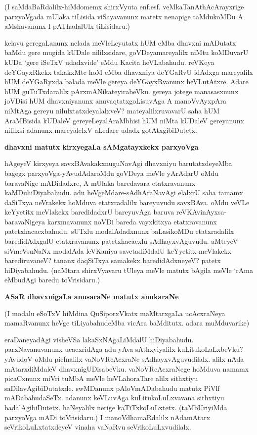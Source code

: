 (I saMdaBaRdalilx-hiMdomemx shirxVyuta enf.esf. veMkaTanAthAcArayxrige 
parxyoVgada mUlaka tiLisida viSayavanunx matetx nenapige taMdukoMDu A aMshavanunx I pAThadalUlx tiLisidaru.)

kelavu geregaLanunx nelada meVleLeyutatx hUM eMba dhavxni mADutatx 
baMdu gere mugida kUDale nililxsidare, goVDeyamareyalilx niMtu 
koMDuvarU kUDa `gere iSeTxV udadxvide' eMdu Kacita heVLabahudu. reVKeya 
deYGayxRkekx takakxMte hoM eMba dhavxniya deYGaRvU idAdxga mareyalilx hUM deYGaRyxda balada meVle gereya deYGayxRvanunx heVLutAtxre. Adare hUM guTuTxdaralilx pArxmANikateyirabeVku. gereya jotege manasasxnunx joVDisi hUM dhavxniyanunx anuvaqtatxgoLisuvAga A manoVvAyxpAra niMtAga gereyu nilulxtatxdeyalalxveV? mateyalilxruvavarU saha hUM AraMBisida kUDaleV gereyeLeyalAraMbhisi hUM niMta kUDaleV gereyanunx nililxsi adanunx mareyalelxV aLedare udadx gotAtxgibiDutetx.

\noindent
\textbf{dhavxni matutx kirxyegaLa sAMgatayxkekx parxyoVga}\label{page120}
  
  hAgeyeV kirxyeya savxBAvakakxnuguNavAgi dhavxniyu barutatxdeyeMba 
  bagegx parxyoVga-yAvudAdaroMdu goVDeya meVle yArAdarU oMdu baravaNige 
  mADidadxre, A mUlaka baredavara etatxravanunx kaMDuhiDiyabahudu. adu heVgeMdare-sAdhAraNavAgi elalxrU saha tamamx daSiTxya neVrakekx hoMduva etatxradalilx bareyuvudu savxBAva. oMdu veVLe keYyetitx meVlakekx baredidadxrU bareyuvAga baruva reVKAvinAyxsa-baravaNigeya karxmavanunx noVDi bareda vayxkitxya etatxravanunx patetxhacacxbahudu. sUTxlu modalAdadxnunx baLasikoMDu etatxradalilx baredidAdxgalU etatxravanunx patetxhacacxlu sAdhayxvAguvudu. aMteyeV siVmeVsuNaNx modalAda leVKaniya savetadiMdalU keYyetitx meVlakekx barediruvaneV? tananx daqSiTxya samakekx baredidAdxneyeV? patetx hiDiyabahudu. (naMtara shirxVyavaru tUleya meVle matutx bAgila meVle `rAma eMbudAgi baredu toVrisidaru.)
  
  \noindent
  \textbf{ASaR dhavxnigaLa anusaraNe matutx anukaraNe}
  
  (I modalu eSoTxV hiMdina QuSiporxVkatx maMtarxgaLa ucAcxraNeya mamaRvanunx heVge tiLiyabahudeMba vicAra baMditutx. adara muMduvarike) 
  
  eraDaneyadAgi visheVSa lakaSxNAgaLiMdalU hiDiyabahudu. parxNavanuvanunx ucacxridAga adu yAva sAthxyiyalilx kuLitukoLaLxbeVku? yAvudoV oMdu picfnalilx vaNoVRcAcxraNe sAdhayxvAguvudilalx. alilx nAda mAtarxdiMdaleV dhavxnigUDisabeVku. vaNoVRcAcxraNege hoMduva namamx picaCxnunx miVri tuMbA meVle heVLahoraTare alilx sithxtiyu saDilavAgibiDutatxde. swMDanunx pAloVmADabahudu matutx PiVlf mADabahudaSeTx. adanunx keVLuvAga kuLitukoLuLxvavana sithxtiyu badalAgibiDutetx. haNeyalilx nerige kaTiTxkoLuLxtetx. (taMbUriyiMda parxyoVga mADi toVrisidaru.) I manoVdhamaRdalilx nAdamAtarx seVrikoLuLxtatxdeyeV vinaha vaNaRvu seVrikoLuLxvudilalx.
  
